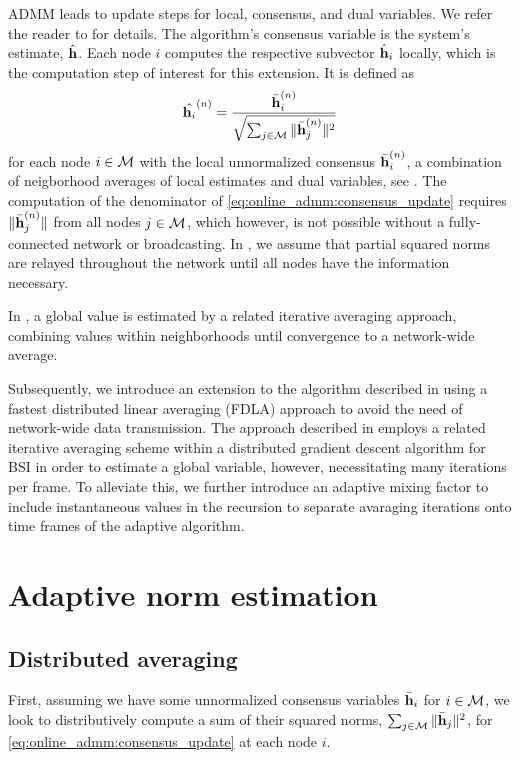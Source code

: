 \documentclass{article}
\begin{document}
ADMM leads to update steps for local, consensus, and dual variables.
We refer the reader to \cite{blochbergerDBSI} for details.
The algorithm's consensus variable is the system's estimate, \(\hat{\bm{\mathrm{h}}}\).
Each node \(i\) computes the respective subvector \(\hat{\bm{\mathrm{h}}}_i\) locally, which is the computation step of interest for this extension.
It is defined as
\begin{equation}
    \hat{\bm{\mathrm{h}}_i}^{(n)} = \frac{\bar{\bm{\mathrm{h}}}_i^{(n)}}{\sqrt{\sum_{j \in \mathcal{M}} \|\bar{\bm{\mathrm{h}}}_j^{(n)}\|^2}}\label{eq:online_admm:consensus_update}
\end{equation}
for each node \(i \in \mathcal{M}\) with the local unnormalized consensus \(\bar{\bm{\mathrm{h}}}_i^{(n)}\), a combination of neigborhood averages of local estimates and dual variables, see \cite{blochbergerDBSI}.
The computation of the denominator of \eqref{eq:online_admm:consensus_update} requires  \(\|\bar{\bm{\mathrm{h}}}_j^{(n)}\|\) from all nodes \(j \in \mathcal{M}\), which however, is not possible without a fully-connected network or broadcasting.
In \cite{blochbergerDBSI}, we assume that partial squared norms are relayed throughout the network until all nodes have the information necessary.

In \cite{yuDistributedBlindSystem2014,liuDistributedBlindIdentification2016},
a global value is estimated by a related iterative averaging approach, combining values within neighborhoods until convergence to a network-wide average.

Subsequently, we introduce an extension to the algorithm described in \cite{blochbergerDBSI} using a fastest distributed linear averaging (FDLA) approach \cite{xiaoFastLinearIterations2004} to avoid the need of network-wide data transmission.
The approach described in \cite{yuDistributedBlindSystem2014,liuDistributedBlindIdentification2016} employs a related iterative averaging scheme within a distributed gradient descent algorithm for BSI in order to estimate a global variable, however, necessitating many iterations per frame.
To alleviate this, we further introduce an adaptive mixing factor to include instantaneous values in the recursion to separate avaraging iterations onto time frames of the adaptive algorithm.

\section{Adaptive norm estimation}
\label{sec:adaptivenormest}

\subsection[]{Distributed averaging}
First, assuming we have some unnormalized consensus variables \(\bar{\bm{\mathrm{h}}}_i\) for \(i \in \mathcal{M}\), we look to distributively compute a sum of their squared norms, \(\sum_{j \in \mathcal{M}} \|\bar{\bm{\mathrm{h}}}_j\|^2\), for \eqref{eq:online_admm:consensus_update} at each node \(i\).
\end{document}
